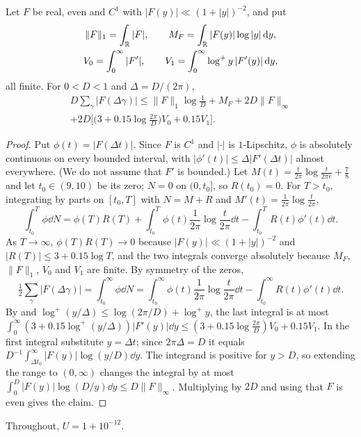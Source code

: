 \documentclass[11pt,colorlinks]{charlie}
\begin{document}
\begin{lemma}\label{lem:zerosum}
Let $F$ be real, even and $C^1$ with $|F(y)|\ll(1+|y|)^{-2}$, and put
\begin{gather*}
 \|F\|_1=\int_{\mathbb{R}}|F|,\qquad M_F=\int_{\mathbb{R}}|F(y)|\log|y|\,\mathrm{d} y,\\
 V_0=\int_0^\infty|F'|,\qquad V_1=\int_0^\infty\log^+y\,|F'(y)|\,\mathrm{d} y,
\end{gather*}
all finite. For $0<D<1$ and $\Delta=D/(2\pi)$,
\begin{multline*}
 D\sum_\gamma|F(\Delta\gamma)|\le\|F\|_1\log\frac1D+M_F+2D\|F\|_\infty\\
 +2D\Big[\Big(3+0.15\log\frac{2\pi}D\Big)V_0+0.15V_1\Big].
\end{multline*}
\end{lemma}
\begin{proof}
Put $\phi(t)=|F(\Delta t)|$. Since $F$ is $C^1$ and $|\cdot|$ is $1$-Lipschitz, $\phi$ is absolutely continuous on every bounded interval, with $|\phi'(t)|\le\Delta|F'(\Delta t)|$ almost everywhere. (We do not assume that $F'$ is bounded.) Let $M(t)=\frac t{2\pi}\log\frac t{2\pi e}+\frac78$ and let $t_0\in(9,10)$ be its zero; $N=0$ on $(0,t_0]$, so $R(t_0)=0$. For $T>t_0$, integrating by parts on $[t_0,T]$ with $N=M+R$ and $M'(t)=\frac1{2\pi}\log\frac t{2\pi}$,
\[
 \int_{t_0}^T\phi\dd N=\phi(T)R(T)+\int_{t_0}^T\phi(t)\frac1{2\pi}\log\frac t{2\pi}\dd t-\int_{t_0}^TR(t)\phi'(t)\dd t .
\]
As $T\to\infty$, $\phi(T)R(T)\to0$ because $|F(y)|\ll(1+|y|)^{-2}$ and $|R(T)|\le3+0.15\log T$, and the two integrals converge absolutely because $M_F$, $\|F\|_1$, $V_0$ and $V_1$ are finite. By symmetry of the zeros,
\[
 \tfrac12\sum_\gamma|F(\Delta\gamma)|=\int_{t_0}^\infty\phi\dd N=\int_{t_0}^\infty\phi(t)\frac1{2\pi}\log\frac t{2\pi}\dd t-\int_{t_0}^\infty R(t)\phi'(t)\dd t .
\]
By  and $\log^+(y/\Delta)\le\log(2\pi/D)+\log^+y$, the last integral is at most $\int_0^\infty(3+0.15\log^+(y/\Delta))|F'(y)|\dd y\le(3+0.15\log\frac{2\pi}D)V_0+0.15V_1$. In the first integral substitute $y=\Delta t$; since $2\pi\Delta=D$ it equals $D^{-1}\int_{\Delta t_0}^\infty|F(y)|\log(y/D)\dd y$. The integrand is positive for $y>D$, so extending the range to $(0,\infty)$ changes the integral by at most $\int_0^D|F(y)|\log(D/y)\dd y\le D\|F\|_\infty$. Multiplying by $2D$ and using that $F$ is even gives the claim.
\end{proof}

Throughout, $U=1+10^{-12}$.
\end{document}
